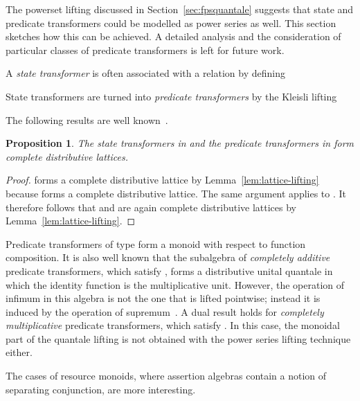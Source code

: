 \documentclass[12pt]{article}
\newtheorem{proposition}{Proposition}
\theoremstyle{definition}
\begin{document}
The powerset lifting discussed in Section~\ref{sec:fpsquantale}
suggests that state and predicate transformers could be modelled as
power series as well.  This section sketches how this can be
achieved. A detailed analysis and the consideration of particular
classes of predicate transformers is left for future work.

A \emph{state transformer}  is often associated with a
relation  by defining

State transformers are turned into \emph{predicate transformers}
 by the Kleisli lifting

The following results are well known~\cite{BvW99-book}.
\begin{proposition}
The  state transformers in  and the predicate transformers in
 form complete distributive lattices.
\end{proposition}
\begin{proof}  forms a complete distributive
  lattice by Lemma~\ref{lem:lattice-lifting} because 
  forms a complete distributive lattice. The same argument applies to
  . It therefore follows that  and  are again
  complete distributive lattices by
  Lemma~\ref{lem:lattice-lifting}.
\end{proof}
Predicate transformers of type  form a monoid with respect
to function composition. It is also well known that the subalgebra of
\emph{completely additive} predicate transformers, which satisfy , forms a distributive
unital quantale in which the identity function is the multiplicative
unit. However, the operation of infimum in this algebra is not the one
that is lifted pointwise; instead it is induced by the operation of
supremum~\cite{BvW99-book}. A dual result holds for \emph{completely
  multiplicative} predicate transformers, which satisfy . In this case, the
monoidal part of the quantale lifting is not obtained with the power
series lifting technique either.

The cases of resource monoids, where assertion algebras contain a
notion of separating conjunction, are more interesting.
\end{document}
